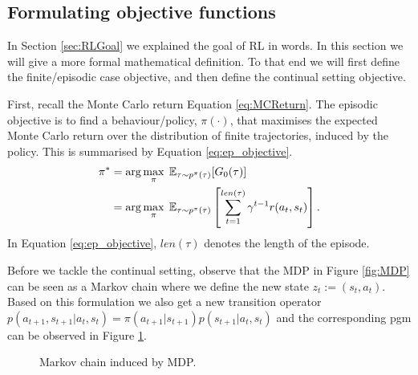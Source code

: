 \documentclass{report}
\numberwithin{equation}{section}
\numberwithin{figure}{section}
\numberwithin{table}{section}
\numberwithin{algorithm}{section}
\begin{document}
\subsection{Formulating objective functions}\label{sec:RLGoalMaths}
In Section \ref{sec:RLGoal} we explained the goal of RL in words. 
In this section we will give a more formal mathematical definition. 
To that end we will first define the finite/episodic case objective, 
and then define the continual setting objective.

First, recall the Monte Carlo return Equation \ref{eq:MCReturn}. The episodic 
objective is to find a behaviour/policy, $\pi(\cdot)$, that maximises 
the expected Monte Carlo return over the distribution of finite 
trajectories, induced by the policy. 
This is summarised by Equation \ref{eq:ep_objective}.
\begin{align}
  \label{eq:ep_objective}
  \pi^*&=\arg \max_{\pi}\; \mathbb{E}_{\tau\sim p^{\pi}(\tau)}[G_0(\tau)]\notag\\
  &=\arg \max_{\pi}\; \mathbb{E}_{\tau\sim p^{\pi}(\tau)}\left[\sum_{t=1}^{len(\tau)}\gamma^{t-1}r(a_{t}, s_{t})\right].
\end{align}
In Equation \ref{eq:ep_objective}, $len(\tau)$ denotes the length of the episode.

Before we tackle the continual setting, observe that the MDP in 
Figure \ref{fig:MDP} can be seen as a Markov chain where we define 
the new state $z_t:=(s_t, a_t)$. Based on this formulation we also 
get a new transition operator 
$p(a_{t+1},s_{t+1}|a_t,s_t)=\pi(a_{t+1}|s_{t+1})p(s_{t+1}|a_t,s_t)$ and 
the corresponding pgm can be observed in Figure \ref{fig:MCz}.

\begin{figure}[H]
  \centering
  \caption{\label{fig:MCz} Markov chain induced by MDP.}
\end{figure}
\end{document}
